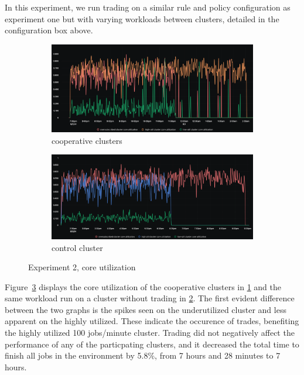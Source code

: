 In this experiment, we run trading on a similar rule and policy configuration
as experiment one but with varying workloads between clusters, detailed in the
configuration box above. 

\begin{figure}[H]
\centering
\begin{subfigure}{.5\textwidth}
  \centering
  \includegraphics[width=.9\linewidth]{./figures/experiment-two/exp-two-coop.png}
  \caption{cooperative clusters}
  \label{fig:exp2coop}
\end{subfigure}%
\begin{subfigure}{.5\textwidth}
  \centering
  \includegraphics[width=.9\linewidth]{./figures/experiment-two/exp-two-control.png}
  \caption{control cluster}
  \label{fig:exp2control}
\end{subfigure}
\caption{Experiment 2, core utilization}
\label{fig:exp2coreutil}
\end{figure}

Figure~\ref{fig:exp2coreutil} displays the core utilization of the cooperative
clusters in \ref{fig:exp2coop} and the same workload run on a cluster without
trading in \ref{fig:exp2control}.
The first evident difference between the two graphs is the spikes seen on the
underutilized cluster and less apparent on the highly utilized. These
indicate the occurence of trades, benefiting the highly utilized 100
jobs/minute cluster. Trading did not negatively affect the performance of any
of the particpating clusters, and it decreased the total time to finish all jobs in
the environment by 5.8\%, from 7 hours and 28 minutes to 7 hours.

